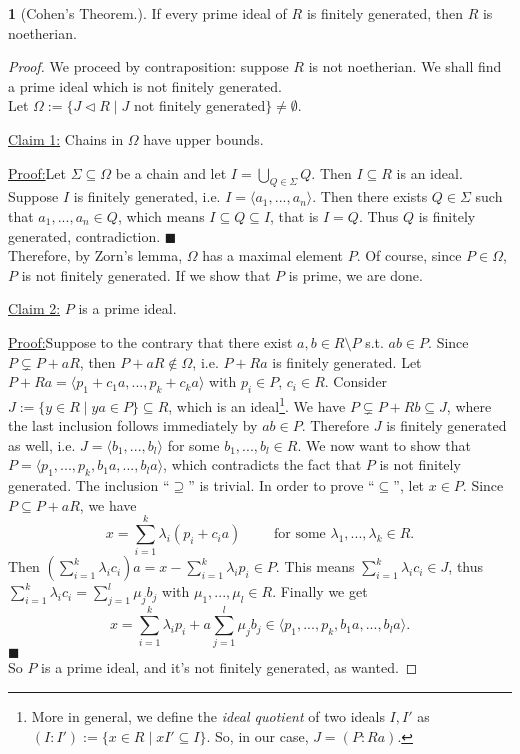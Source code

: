 \documentclass[12pt,a4paper]{report}
\theoremstyle{definition}
\theoremstyle{num.custom-title}
\newtheorem{teo_custom-title}[theorem]{} %
\newenvironment{claim}[1]{\par\noindent\underline{Claim#1:}\space}{} %
\newenvironment{claimproof}[1]{\par\noindent\underline{Proof:}\space#1}{\leavevmode\unskip\penalty9999 \hbox{}\nobreak\hfill\quad\hbox{$\blacksquare$}} %
\DeclareMathOperator{\sm}{\setminus}
\DeclareMathOperator{\sse}{\subseteq}
\begin{document}
\begin{teo_custom-title}[Cohen's Theorem.]
If every prime ideal of $R$ is finitely generated, then $R$ is noetherian.
\begin{proof}
We proceed by contraposition: suppose $R$ is not noetherian. We shall find a prime ideal which is not finitely generated.\\
Let $\Omega := \{J \lhd R \mid J$ not finitely generated$\} \neq \emptyset$.
\begin{claim}{ 1}
Chains in $\Omega$ have upper bounds.
\begin{claimproof}
Let $\Sigma \sse \Omega$ be a chain and let $I=\bigcup_{Q \in \Sigma} Q$. Then $I \sse R$ is an ideal. Suppose $I$ is finitely generated, i.e. $I= \langle a_1,...,a_n \rangle$. Then there exists $Q \in \Sigma$ such that $a_1,...,a_n \in Q$, which means $I \sse Q \sse I$, that is $I=Q$. Thus $Q$ is finitely generated, contradiction.
\end{claimproof}
\end{claim}\\
Therefore, by Zorn's lemma, $\Omega$ has a maximal element $P$. Of course, since $P \in \Omega$, $P$ is not finitely generated. If we show that $P$ is prime, we are done.
\begin{claim}{ 2}
$P$ is a prime ideal.
\begin{claimproof}
Suppose to the contrary that there exist $a,b \in R \sm P$ s.t. $ab \in P$. Since $P \subsetneq P+aR$, then $P+aR \not\in \Omega$, i.e. $P+Ra$ is finitely generated. Let $P+Ra= \langle p_1+c_1 a,...,p_k+c_k a \rangle$ with $p_i \in P$, $c_i \in R$. Consider $J:=\{y \in R \mid ya \in P\} \sse R$, which is an ideal\footnote{More in general, we define the \emph{ideal quotient} of two ideals $I,I'$ as $(I:I'):=\{x \in R \mid xI' \sse I\}$. So, in our case, $J=(P:Ra)$.}. We have $P \subsetneq P+Rb \sse J$, where the last inclusion follows immediately by $ab \in P$. Therefore $J$ is finitely generated as well, i.e. $J=\langle b_1,...,b_l \rangle$ for some $b_1,...,b_l \in R$. We now want to show that $P=\langle p_1,...,p_k,b_1a,...,b_la \rangle$, which contradicts the fact that $P$ is not finitely generated. The inclusion ``$\supseteq$'' is trivial. In order to prove ``$\sse$'', let $x \in P$. Since $P \sse P+aR$, we have
\[
x=\sum_{i=1}^k \lambda_i(p_i+c_i a) \qquad \text{ for some } \lambda_1,...,\lambda_k \in R.
\]
Then $\left( \sum_{i=1}^k \lambda_i c_i \right) a = x - \sum_{i=1}^k \lambda_i p_i \in P$. This means $\sum_{i=1}^k \lambda_i c_i \in J$, thus $\sum_{i=1}^k \lambda_i c_i = \sum_{j=1}^l \mu_j b_j$ with $\mu_1,...,\mu_l \in R$. Finally we get
\[
x= \sum_{i=1}^k \lambda_i p_i + a \sum_{j=1}^l \mu_j b_j \in \langle p_1,...,p_k,b_1a,...,b_la \rangle.
\]
\end{claimproof}
\end{claim}\\
So $P$ is a prime ideal, and it's not finitely generated, as wanted.
\end{proof}
\end{teo_custom-title}
\end{document}
